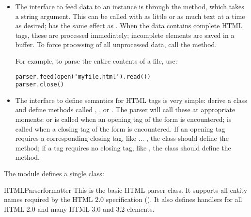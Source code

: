 \begin{itemize}

\item
The interface to feed data to an instance is through the 
method, which takes a string argument.  This can be called with as
little or as much text at a time as desired;  has the same effect as .  When the data
contains complete HTML tags, these are processed immediately;
incomplete elements are saved in a buffer.  To force processing of all
unprocessed data, call the  method.

For example, to parse the entire contents of a file, use:
\begin{verbatim}
parser.feed(open('myfile.html').read())
parser.close()
\end{verbatim}

\item
The interface to define semantics for HTML tags is very simple: derive
a class and define methods called ,
, or .  The parser will
call these at appropriate moments:  or
 is called when an opening tag of the form
 is encountered;  is called
when a closing tag of the form  is encountered.  If
an opening tag requires a corresponding closing tag, like 
... , the class should define the 
method; if a tag requires no closing tag, like , the class
should define the  method.

\end{itemize}

The module defines a single class:

\begin{classdesc}{HTMLParser}{formatter}
This is the basic HTML parser class.  It supports all entity names
required by the HTML 2.0 specification ().  It also defines
handlers for all HTML 2.0 and many HTML 3.0 and 3.2 elements.
\end{classdesc}


\begin{seealso}
\end{seealso}


